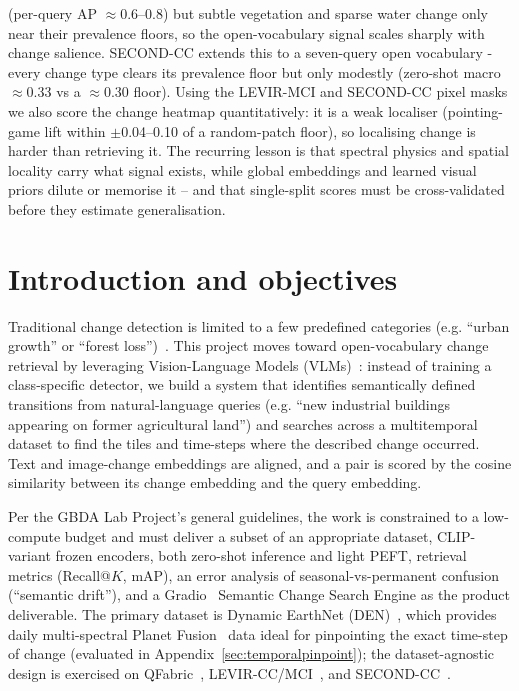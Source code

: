 \documentclass{article}
\begin{document}
(per-query AP $\approx$0.6--0.8) but subtle vegetation and sparse water change
only near their prevalence floors, so the open-vocabulary signal scales sharply
with change salience. SECOND-CC extends this to a seven-query open vocabulary -
every change type clears its prevalence floor but only modestly (zero-shot macro
$\approx$0.33 vs a $\approx$0.30 floor). Using the LEVIR-MCI and SECOND-CC pixel masks we
also score the change heatmap quantitatively: it is a weak localiser
(pointing-game lift within $\pm$0.04--0.10 of a random-patch floor), so
localising change is harder than retrieving it. The recurring lesson is that
spectral physics and spatial locality carry what signal exists, while global
embeddings and learned visual priors dilute or memorise it -- and that
single-split scores must be cross-validated before they estimate generalisation.


\setcounter{tocdepth}{2}
\tableofcontents


\clearpage


\section{Introduction and objectives}
\label{sec:intro}

Traditional change detection is limited to a few predefined categories
(e.g. ``urban growth'' or ``forest loss'')~\cite{changedetection}. This project
moves toward open-vocabulary change retrieval by leveraging Vision-Language
Models (VLMs)~\cite{clip}: instead of training a class-specific detector, we
build a system that identifies semantically defined transitions from
natural-language queries (e.g. ``new industrial buildings appearing on former
agricultural land'') and searches across a multitemporal dataset to find the
tiles and time-steps where the described change occurred. Text and image-change
embeddings are aligned, and a pair is scored by the cosine similarity between
its change embedding and the query embedding.

Per the GBDA Lab Project's general guidelines, the work is constrained to a low-compute budget and
must deliver a subset of an appropriate dataset, CLIP-variant frozen encoders,
both zero-shot inference and light PEFT, retrieval metrics (Recall@$K$, mAP), an
error analysis of seasonal-vs-permanent confusion (``semantic drift''), and a
Gradio~\cite{gradio} Semantic Change Search Engine as the product deliverable.
The primary dataset is Dynamic EarthNet (DEN)~\cite{dynamicearthnet}, which
provides daily multi-spectral Planet Fusion~\cite{planetfusion} data ideal for
pinpointing the exact time-step of change (evaluated in
Appendix~\ref{sec:temporalpinpoint}); the dataset-agnostic design is
exercised on QFabric~\cite{qfabric}, LEVIR-CC/MCI~\cite{levircc,levirmci}, and
SECOND-CC~\cite{secondcc}.
\end{document}
